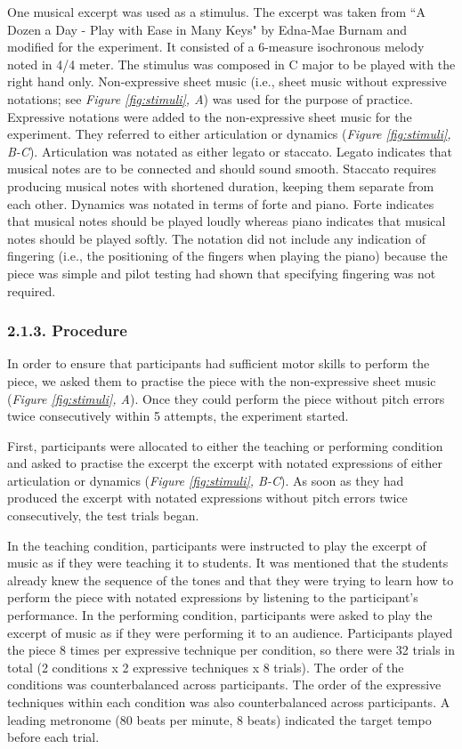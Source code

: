 \documentclass[
  english,
  man,floatsintext]{apa6}
\begin{document}
One musical excerpt was used as a stimulus. The excerpt was taken from ``A Dozen a Day - Play with Ease in Many Keys" by Edna-Mae Burnam and modified for the experiment. It consisted of a 6-measure isochronous melody noted in 4/4 meter. The stimulus was composed in C major to be played with the right hand only. Non-expressive sheet music (i.e., sheet music without expressive notations; see \emph{Figure \ref{fig:stimuli}, A}) was used for the purpose of practice. Expressive notations were added to the non-expressive sheet music for the experiment. They referred to either articulation or dynamics (\emph{Figure \ref{fig:stimuli}, B-C}). Articulation was notated as either legato or staccato. Legato indicates that musical notes are to be connected and should sound smooth. Staccato requires producing musical notes with shortened duration, keeping them separate from each other. Dynamics was notated in terms of forte and piano. Forte indicates that musical notes should be played loudly whereas piano indicates that musical notes should be played softly. The notation did not include any indication of fingering (i.e., the positioning of the fingers when playing the piano) because the piece was simple and pilot testing had shown that specifying fingering was not required.

\hypertarget{procedure}{%
\subsubsection{2.1.3. Procedure}\label{procedure}}

In order to ensure that participants had sufficient motor skills to perform the piece, we asked them to practise the piece with the non-expressive sheet music (\emph{Figure \ref{fig:stimuli}, A}). Once they could perform the piece without pitch errors twice consecutively within 5 attempts, the experiment started.

First, participants were allocated to either the teaching or performing condition and asked to practise the excerpt the excerpt with notated expressions of either articulation or dynamics (\emph{Figure \ref{fig:stimuli}, B-C}). As soon as they had produced the excerpt with notated expressions without pitch errors twice consecutively, the test trials began.

In the teaching condition, participants were instructed to play the excerpt of music as if they were teaching it to students. It was mentioned that the students already knew the sequence of the tones and that they were trying to learn how to perform the piece with notated expressions by listening to the participant's performance. In the performing condition, participants were asked to play the excerpt of music as if they were performing it to an audience. Participants played the piece 8 times per expressive technique per condition, so there were 32 trials in total (2 conditions x 2 expressive techniques x 8 trials). The order of the conditions was counterbalanced across participants. The order of the expressive techniques within each condition was also counterbalanced across participants. A leading metronome (80 beats per minute, 8 beats) indicated the target tempo before each trial.
\end{document}
